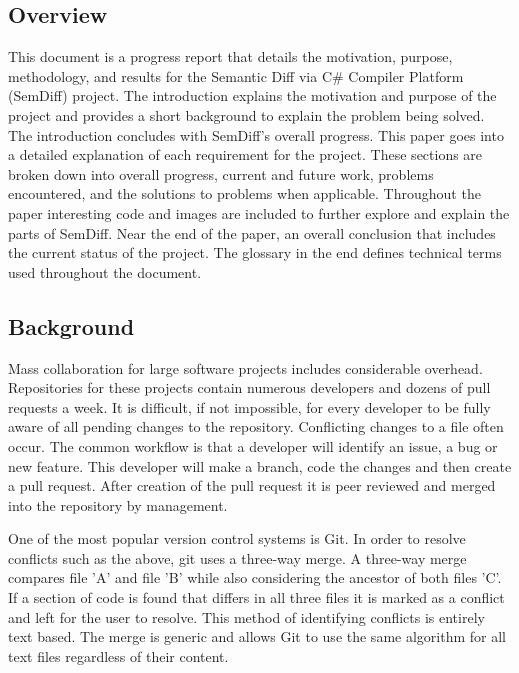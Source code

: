 \documentclass[draftclsnofoot,onecolumn]{IEEEtran}
\begin{document}
\subsection{Overview}%

This document is a progress report that details the motivation, purpose, 
methodology, and results for the Semantic Diff via C\# Compiler Platform 
(SemDiff) project. The introduction explains the motivation and purpose of the 
project and provides a short background to explain the problem being solved. 
The introduction concludes with SemDiff's overall progress. This paper goes 
into a detailed explanation of each requirement for the project. These sections 
are broken down into overall progress, current and future work, problems 
encountered, and the solutions to problems when applicable. Throughout the 
paper interesting code and images are included to further explore and explain 
the parts of SemDiff. Near the end of the paper, an overall conclusion that 
includes the current status of the project. The glossary in the end defines 
technical terms used throughout the document.

\subsection{Background}%

Mass collaboration for large software projects includes considerable overhead. 
Repositories for these projects contain numerous developers and dozens of pull 
requests a week. It is difficult, if not impossible, for every developer to be 
fully aware of all pending changes to the repository. Conflicting changes to a 
file often occur. The common workflow is that a developer will identify an 
issue, a bug or new feature. This developer will make a branch, code the 
changes and then create a pull request. After creation of the pull request it 
is peer reviewed and merged into the repository by management.

One of the most popular version control systems is Git. In order to resolve 
conflicts such as the above, git uses a three-way merge. A three-way merge 
compares file 'A' and file 'B' while also considering the ancestor of both 
files 'C'. If a section of code is found that differs in all three files it is 
marked as a conflict and left for the user to resolve. This method of 
identifying conflicts is entirely text based. The merge is generic and allows 
Git to use the same algorithm for all text files regardless of their content.
\end{document}
